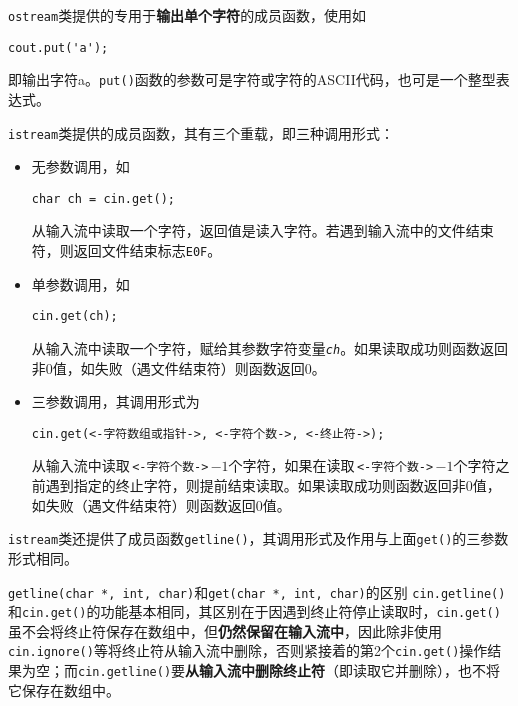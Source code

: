 \documentclass[10pt, a4paper, oneside, fontset=none]{ctexart}
\theoremstyle{plain}
\theoremstyle{definition}
\newcommand{\zhu}[2][]{\begin{note}{#1}\xiu #2\end{note}}
\newcommand{\tboqi}[1]{\textbf{\xiu\color{qinglv!75!black}#1}}
\begin{document}
\begin{description}[leftmargin=2em, labelsep=1em, itemindent=-1em, itemsep=0pt, parsep=0pt, topsep=3pt, partopsep=0pt]
	\item[\texttt{put()}] 
	\texttt{ostream}类提供的专用于\textbf{输出单个字符}的成员函数，使用如
\begin{lstlisting}[xleftmargin=1em]
	cout.put('a');
\end{lstlisting}
	即输出字符{\mono a}。\texttt{put()}函数的参数可是字符或字符的ASCII代码，也可是一个整型表达式。

	\item[\texttt{get()}]
	\texttt{istream}类提供的成员函数，其有三个重载，即三种调用形式：
	\begin{itemize}[leftmargin=1em, topsep=0pt]
		\item 无参数调用，如
\begin{lstlisting}[xleftmargin=1em, moreemph={[2]{ch}}, emphstyle={[2]\it\ttfamily}]
	char ch = cin.get();
\end{lstlisting}
		从输入流中读取一个字符，返回值是读入字符。若遇到输入流中的文件结束符，则返回文件结束标志\texttt{E0F}。
		\item 单参数调用，如
\begin{lstlisting}[xleftmargin=1em, moreemph={[2]{ch}}, emphstyle={[2]\it\ttfamily}]
	cin.get(ch);
\end{lstlisting}
		从输入流中读取一个字符，赋给其参数字符变量\texttt{\textit{ch}}。如果读取成功则函数返回非0值，如失败（遇文件结束符）则函数返回0。
		\item 三参数调用，其调用形式为
\begin{lstlisting}[xleftmargin=1em, style=intro]
	cin.get(<-字符数组或指针->, <-字符个数->, <-终止符->);
\end{lstlisting}
		从输入流中读取\,\lstinline[style=intro]|<-字符个数->|\,$\mathop-1$个字符，如果在读取\,\lstinline[style=intro]|<-字符个数->|\,$\mathop-1$个字符之前遇到指定的终止字符，则提前结束读取。如果读取成功则函数返回非0值，如失败（遇文件结束符）则函数返回0值。
	\end{itemize}

	\item[\texttt{getline()}]
	\texttt{istream}类还提供了成员函数\texttt{getline()}，其调用形式及作用与上面\texttt{get()}的三参数形式相同。

	\zhu[\texttt{getline(char *, int, char)}和\texttt{get(char *, int, char)}的区别]{
		\texttt{cin.getline()}和\texttt{cin.get()}的功能基本相同，其区别在于因遇到终止符停止读取时，\texttt{cin.get()}虽不会将终止符保存在数组中，但\tboqi{仍然保留在输入流中}，因此除非使用\texttt{cin.ignore()}等将终止符从输入流中删除，否则紧接着的第2个\texttt{cin.get()}操作结果为空；而\texttt{cin.getline()}要\tboqi{从输入流中删除终止符}（即读取它并删除），也不将它保存在数组中。
	}


\end{description}
\end{document}
